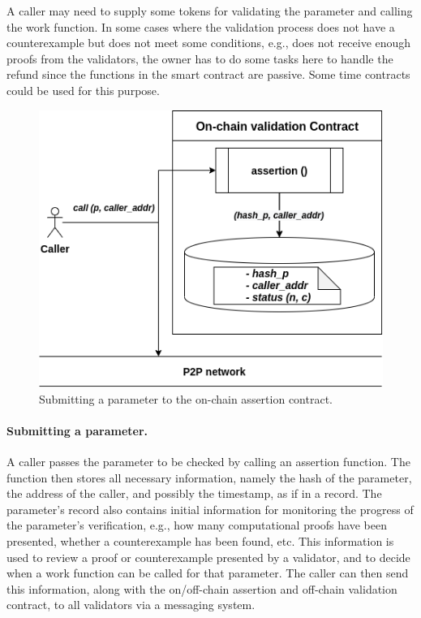 \documentclass[runningheads]{llncs}
\begin{document}
A caller may need to supply some tokens for validating the parameter and calling the work function. In some cases where the validation process does not have a counterexample but does not meet some conditions, e.g., does not receive enough proofs from the validators, the owner has to do some tasks here to handle the refund since the functions in the smart contract are passive. Some time contracts could be used for this purpose.


\begin{figure}
\centering
\includegraphics[scale=.6]{caller}
\caption{Submitting a parameter to the on-chain assertion contract.}
\end{figure}

\paragraph{Submitting a parameter.} A caller passes the parameter to be checked by calling an assertion function. The function then stores all necessary information, namely the hash of the parameter, the address of the caller, and possibly the timestamp, as if in a record. The parameter's record also contains initial information for monitoring the progress of the parameter's verification, e.g., how many computational proofs have been presented, whether a counterexample has been found, etc. This information is used to review a proof or counterexample presented by a validator, and to decide when a work function can be called for that parameter. The caller can then send this information, along with the on/off-chain assertion and off-chain validation contract, to all validators via a messaging system.
\end{document}
